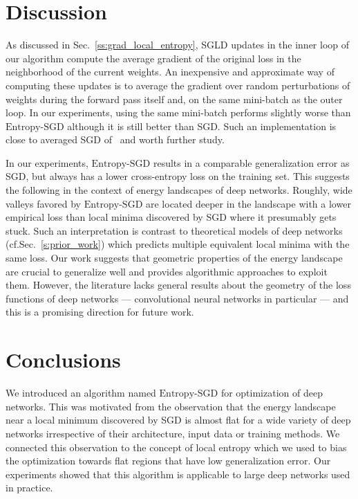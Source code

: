 \documentclass[10pt]{article}
\newcommand{\entropysgd}{\mathrm{Entropy}\textrm{-}\mathrm{SGD}}
\newcommand{\todo}[1]{{\color{gray}#1}\marginpar{\tiny\noindent{\raggedright{\color{blue}[TODO]}}}}
\begin{document}
\section{Discussion}
\label{s:discussion}

\todo{
As discussed in Sec.~\ref{ss:grad_local_entropy}, SGLD updates in the inner loop of our algorithm compute the average gradient of the original loss in the neighborhood of the current weights. An inexpensive and approximate way of computing these updates is to average the gradient over random perturbations of weights during the forward pass itself and, on the same mini-batch as the outer loop. In our experiments, using the same mini-batch performs slightly worse than $\entropysgd$ although it is still better than SGD. Such an implementation is close to averaged SGD of~\citep{polyak1992acceleration,bottou2012stochastic} and worth further study.}

In our experiments, $\entropysgd$ results in a comparable generalization error as SGD, but always has a lower cross-entropy loss on the training set. This suggests the following in the context of energy landscapes of deep networks. Roughly, wide valleys favored by $\entropysgd$ are located deeper in the landscape with a lower empirical loss than local minima discovered by SGD where it presumably gets stuck. Such an interpretation is contrast to theoretical models of deep networks (cf.\@ Sec.~\ref{s:prior_work}) which predicts multiple equivalent local minima with the same loss. Our work suggests that geometric properties of the energy landscape are crucial to generalize well and provides algorithmic approaches to exploit them. However, the literature lacks general results about the geometry of the loss functions of deep networks --- convolutional neural networks in particular --- and this is a promising direction for future work.

\section{Conclusions}
\label{s:conclusions}

We introduced an algorithm named $\entropysgd$ for optimization of deep networks. This was motivated from the observation that the energy landscape near a local minimum discovered by SGD is almost flat for a wide variety of deep networks irrespective of their architecture, input data or training methods. We connected this observation to the concept of local entropy which we used to bias the optimization towards flat regions that have low generalization error. Our experiments showed that this algorithm is applicable to large deep networks used in practice.
\end{document}
